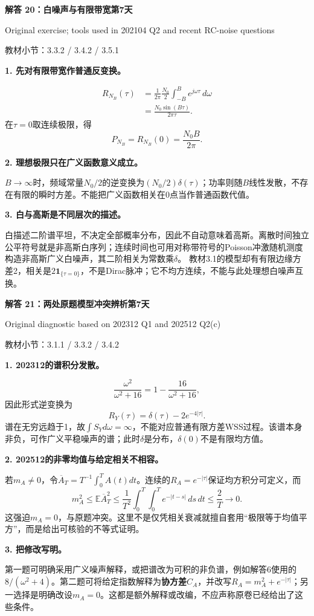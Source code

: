 \documentclass[10.5pt,fontset=fandol]{ctexart}
\newcommand{\E}{\mathbb E}\newcommand{\ee}{\mathrm e}\newcommand{\jj}{\mathrm j}
\newcommand{\qtitle}[2]{\par\addvspace{.85em}\Needspace{10\baselineskip}\begin{tcolorbox}[colback=navy,colframe=navy,arc=1.5pt,boxrule=0pt]\color{white}\large\bfseries #1\hfill\small #2\end{tcolorbox}}
\newcommand{\step}[1]{\par\addvspace{.4em}\Needspace{4\baselineskip}\textbf{#1}\par}\hypersetup{pdftitle={SSA Chapter 3 Review Solutions - Chinese}}
\begin{document}
\qtitle{解答 20：白噪声与有限带宽}{第7天}
{\small\color{accentred}Original exercise; tools used in 202104 Q2 and recent RC-noise questions}\par{\small\color{muted}教材小节：3.3.2 / 3.4.2 / 3.5.1}\par\smallskip\step{1. 先对有限带宽作普通反变换。}
\[\begin{aligned}R_{N_B}(\tau)&=\frac1{2\pi}\frac{N_0}{2}\int_{-B}^{B}e^{j\omega\tau}\,d\omega\\
&=\boxed{\frac{N_0\sin(B\tau)}{2\pi\tau}}.
\end{aligned}\]
在$\tau=0$取连续极限，得
\[\boxed{P_{N_B}=R_{N_B}(0)=\frac{N_0B}{2\pi}}.\]
\step{2. 理想极限只在广义函数意义成立。}
$B\to\infty$时，频域常量$N_0/2$的逆变换为$(N_0/2)\delta(\tau)$；功率则随$B$线性发散，不存在有限的瞬时方差。不能把广义函数相关在0点当作普通函数代值。
\step{3. 白与高斯是不同层次的描述。}
白描述二阶谱平坦，不决定全部概率分布，因此不自动意味着高斯。离散时间独立公平符号就是非高斯白序列；连续时间也可用对称带符号的Poisson冲激随机测度构造非高斯广义白噪声，其二阶相关为常数乘$\delta$。
教材3.1的模型却有有限边缘方差2，相关是$2\mathbf1_{\{\tau=0\}}$，不是Dirac脉冲；它不均方连续，不能与此处理想白噪声互换。

\qtitle{解答 21：两处原题模型冲突辨析}{第7天}
{\small\color{accentred}Original diagnostic based on 202312 Q1 and 202512 Q2(c)}\par{\small\color{muted}教材小节：3.1.1 / 3.3.2 / 3.4.2}\par\smallskip\step{1. 202312的谱积分发散。}
\[\frac{\omega^2}{\omega^2+16}=1-\frac{16}{\omega^2+16},\]
因此形式逆变换为
\[\boxed{R_Y(\tau)=\delta(\tau)-2e^{-4|\tau|}}.\]
谱在无穷远趋于1，故$\int S_Yd\omega=\infty$，不能对应普通有限方差WSS过程。该谱本身非负，可作广义平稳噪声的谱；此时$\delta$是分布，$\delta(0)$不是有限均方值。
\step{2. 202512的非零均值与给定相关不相容。}
若$m_A\ne0$，令$\overline A_T=T^{-1}\int_0^T A(t)dt$。连续的$R_A=e^{-|\tau|}$保证均方积分可定义，而
\[m_A^2\le\E\overline A_T^2
\le\frac1{T^2}\int_0^T\!\int_0^T e^{-|t-s|}\,ds\,dt\le\frac2T\longrightarrow0.\]
这强迫$m_A=0$，与原题冲突。这里不是仅凭相关衰减就擅自套用“极限等于均值平方”，而是给出可核验的不等式证明。
\step{3. 把修改写明。}
第一题可明确采用广义噪声解释，或把谱改为可积的非负谱，例如解答6使用的$8/(\omega^2+4)$。第二题可将给定指数解释为\textbf{协方差}$C_A$，并改写$R_A=m_A^2+e^{-|\tau|}$；另一选择是明确改设$m_A=0$。这都是额外解释或改编，不应声称原卷已经给出了这些条件。
\end{document}
